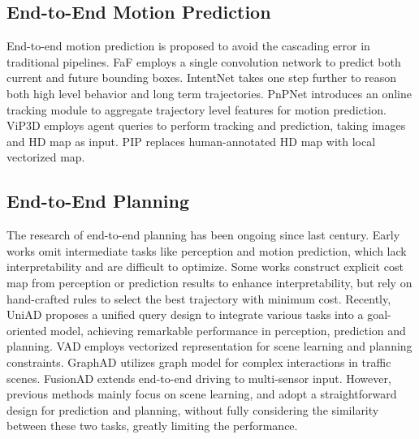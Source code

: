 \subsection{End-to-End Motion Prediction}
End-to-end motion prediction is proposed to avoid the cascading error in traditional pipelines. FaF\cite{faf} employs a single convolution network to predict both current and future bounding boxes. IntentNet\cite{intentnet} takes one step further to reason both high level behavior and long term trajectories. PnPNet\cite{pnpnet} introduces an online tracking module to aggregate trajectory level features for motion prediction. ViP3D\cite{vip3d} employs agent queries to perform tracking and prediction, taking images and HD map as input. PIP\cite{pip} replaces human-annotated HD map with local vectorized map.

\subsection{End-to-End Planning}
The research of end-to-end planning has been ongoing since last century\cite{pomerleau1988alvinn}. Early works\cite{codevilla2018end, codevilla2019exploring, prakash2021multi} omit intermediate tasks like perception and motion prediction, which lack interpretability and are difficult to optimize. Some works\cite{stp3, mp3, sadat2020perceive, cui2021lookout} construct explicit cost map from perception or prediction results to enhance interpretability, but rely on hand-crafted rules to select the best trajectory with minimum cost. Recently, UniAD\cite{uniad} proposes a unified query design to integrate various tasks into a goal-oriented model, achieving remarkable performance in perception, prediction and planning. VAD\cite{vad} employs vectorized representation for scene learning and planning constraints. GraphAD\cite{graphad} utilizes graph model for complex interactions in traffic scenes. FusionAD\cite{fusionad} extends end-to-end driving to multi-sensor input. However, previous methods mainly focus on scene learning, and adopt a straightforward design for prediction and planning, without fully considering the similarity between these two tasks, greatly limiting the performance.